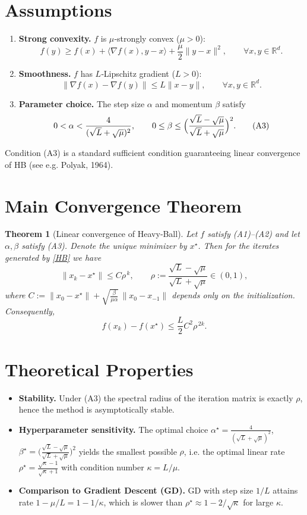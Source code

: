 \documentclass[11pt]{article}
\newtheorem{theorem}{Theorem}
\begin{document}
\newpage
\section*{Assumptions}
\begin{enumerate}
\item[(A1)] \textbf{Strong convexity.} $f$ is $\mu$‑strongly convex ($\mu>0$):
\[
f(y)\ge f(x)+\langle\nabla f(x),y-x\rangle+\frac{\mu}{2}\|y-x\|^{2},\qquad\forall x,y\in\mathbb{R}^d.
\tag{A1}
\]
\item[(A2)] \textbf{Smoothness.} $f$ has $L$‑Lipschitz gradient ($L>0$):
\[
\|\nabla f(x)-\nabla f(y)\|\le L\|x-y\|,\qquad\forall x,y\in\mathbb{R}^d.
\tag{A2}
\]
\item[(A3)] \textbf{Parameter choice.} The step size $\alpha$ and momentum $\beta$ satisfy
\[
0<\alpha<\frac{4}{(\sqrt{L}+\sqrt{\mu})^{2}},\qquad
0\le\beta\le\Bigl(\frac{\sqrt{L}-\sqrt{\mu}}{\sqrt{L}+\sqrt{\mu}}\Bigr)^{2}.
\tag{A3}
\]
\end{enumerate}
Condition (A3) is a standard sufficient condition guaranteeing linear convergence of HB (see e.g. Polyak, 1964).

\section*{Main Convergence Theorem}
\begin{theorem}[Linear convergence of Heavy‑Ball]\label{thm:hb}
Let $f$ satisfy (A1)–(A2) and let $\alpha,\beta$ satisfy (A3). Denote the unique minimizer by $x^\star$. Then for the iterates generated by \eqref{HB} we have
\[
\|x_k-x^\star\|\le C\rho^{\,k},\qquad
\rho:=\frac{\sqrt{L}-\sqrt{\mu}}{\sqrt{L}+\sqrt{\mu}}\in(0,1),
\tag{T1}
\]
where $C:=\|x_0-x^\star\|+\sqrt{\frac{\beta}{\mu\alpha}}\,\|x_0-x_{-1}\|$ depends only on the initialization.
Consequently,
\[
f(x_k)-f(x^\star)\le \frac{L}{2}C^{2}\rho^{\,2k}.
\tag{T2}
\]
\end{theorem}

\section*{Theoretical Properties}
\begin{itemize}
\item \textbf{Stability.} Under (A3) the spectral radius of the iteration matrix is exactly $\rho$, hence the method is asymptotically stable.
\item \textbf{Hyperparameter sensitivity.} The optimal choice $\alpha^\star=\frac{4}{(\sqrt{L}+\sqrt{\mu})^{2}}$, $\beta^\star=\bigl(\frac{\sqrt{L}-\sqrt{\mu}}{\sqrt{L}+\sqrt{\mu}}\bigr)^{2}$ yields the smallest possible $\rho$, i.e. the optimal linear rate $\rho^\star=\frac{\sqrt{\kappa}-1}{\sqrt{\kappa}+1}$ with condition number $\kappa=L/\mu$.
\item \textbf{Comparison to Gradient Descent (GD).} GD with step size $1/L$ attains rate $1-\mu/L=1-1/\kappa$, which is slower than $\rho^\star\approx 1-2/\sqrt{\kappa}$ for large $\kappa$.
\end{itemize}
\end{document}

